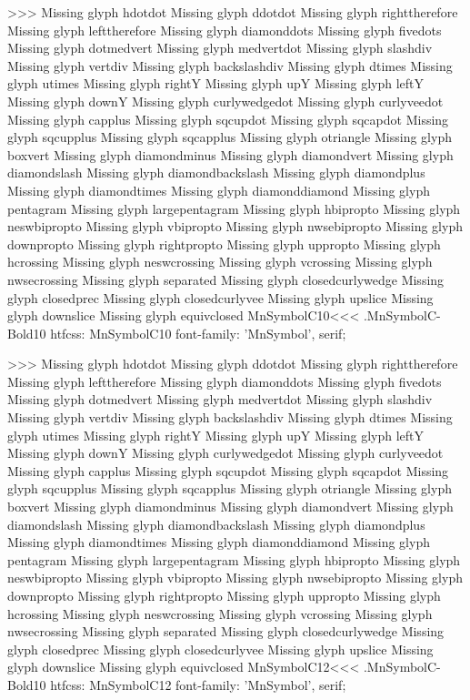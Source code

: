 >>>
Missing glyph	hdotdot
Missing glyph	ddotdot
Missing glyph	righttherefore
Missing glyph	lefttherefore
Missing glyph	diamonddots
Missing glyph	fivedots
Missing glyph	dotmedvert
Missing glyph	medvertdot
Missing glyph	slashdiv
Missing glyph	vertdiv
Missing glyph	backslashdiv
Missing glyph	dtimes
Missing glyph	utimes
Missing glyph	rightY
Missing glyph	upY
Missing glyph	leftY
Missing glyph	downY
Missing glyph	curlywedgedot
Missing glyph	curlyveedot
Missing glyph	capplus
Missing glyph	sqcupdot
Missing glyph	sqcapdot
Missing glyph	sqcupplus
Missing glyph	sqcapplus
Missing glyph	otriangle
Missing glyph	boxvert
Missing glyph	diamondminus
Missing glyph	diamondvert
Missing glyph	diamondslash
Missing glyph	diamondbackslash
Missing glyph	diamondplus
Missing glyph	diamondtimes
Missing glyph	diamonddiamond
Missing glyph	pentagram
Missing glyph	largepentagram
Missing glyph	hbipropto
Missing glyph	neswbipropto
Missing glyph	vbipropto
Missing glyph	nwsebipropto
Missing glyph	downpropto
Missing glyph	rightpropto
Missing glyph	uppropto
Missing glyph	hcrossing
Missing glyph	neswcrossing
Missing glyph	vcrossing
Missing glyph	nwsecrossing
Missing glyph	separated
Missing glyph	closedcurlywedge
Missing glyph	closedprec
Missing glyph	closedcurlyvee
Missing glyph	upslice
Missing glyph	downslice
Missing glyph	equivclosed
\<MnSymbolC10\><<<
.MnSymbolC-Bold10
htfcss:  MnSymbolC10  font-family: 'MnSymbol', serif;

>>>
Missing glyph	hdotdot
Missing glyph	ddotdot
Missing glyph	righttherefore
Missing glyph	lefttherefore
Missing glyph	diamonddots
Missing glyph	fivedots
Missing glyph	dotmedvert
Missing glyph	medvertdot
Missing glyph	slashdiv
Missing glyph	vertdiv
Missing glyph	backslashdiv
Missing glyph	dtimes
Missing glyph	utimes
Missing glyph	rightY
Missing glyph	upY
Missing glyph	leftY
Missing glyph	downY
Missing glyph	curlywedgedot
Missing glyph	curlyveedot
Missing glyph	capplus
Missing glyph	sqcupdot
Missing glyph	sqcapdot
Missing glyph	sqcupplus
Missing glyph	sqcapplus
Missing glyph	otriangle
Missing glyph	boxvert
Missing glyph	diamondminus
Missing glyph	diamondvert
Missing glyph	diamondslash
Missing glyph	diamondbackslash
Missing glyph	diamondplus
Missing glyph	diamondtimes
Missing glyph	diamonddiamond
Missing glyph	pentagram
Missing glyph	largepentagram
Missing glyph	hbipropto
Missing glyph	neswbipropto
Missing glyph	vbipropto
Missing glyph	nwsebipropto
Missing glyph	downpropto
Missing glyph	rightpropto
Missing glyph	uppropto
Missing glyph	hcrossing
Missing glyph	neswcrossing
Missing glyph	vcrossing
Missing glyph	nwsecrossing
Missing glyph	separated
Missing glyph	closedcurlywedge
Missing glyph	closedprec
Missing glyph	closedcurlyvee
Missing glyph	upslice
Missing glyph	downslice
Missing glyph	equivclosed
\<MnSymbolC12\><<<
.MnSymbolC-Bold10
htfcss:  MnSymbolC12  font-family: 'MnSymbol', serif;

